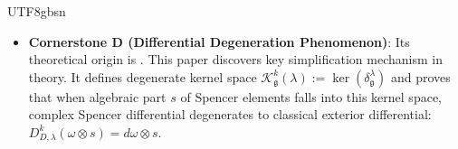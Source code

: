 \documentclass[a4paper,12pt]{extarticle}
\theoremstyle{definition}
\begin{document}
\begin{CJK}{UTF8}{gbsn}
\begin{itemize}
    \item \textbf{Cornerstone D (Differential Degeneration Phenomenon)}: Its theoretical origin is \cite{zheng2025spencerdifferentialdegenerationtheory}. This paper discovers key simplification mechanism in theory. It defines degenerate kernel space $\mathcal{K}_{\mathfrak{g}}^k(\lambda) := \ker(\delta_{\mathfrak{g}}^\lambda)$ and proves that when algebraic part $s$ of Spencer elements falls into this kernel space, complex Spencer differential degenerates to classical exterior differential: $D_{D,\lambda}^k(\omega \otimes s) = d\omega \otimes s$.
\end{itemize}




 



\end{CJK}
\end{document}
